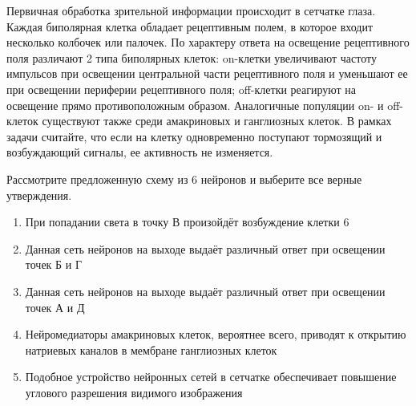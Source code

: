 
Первичная обработка зрительной информации происходит в
сетчатке глаза. Каждая биполярная клетка обладает рецептивным полем, в которое
входит несколько колбочек или палочек. По характеру ответа на освещение
рецептивного поля различают 2 типа биполярных клеток: on-клетки увеличивают частоту импульсов при освещении центральной
части рецептивного поля и уменьшают ее при освещении периферии рецептивного
поля; off-клетки реагируют на
освещение прямо противоположным образом. Аналогичные популяции on- и off-клеток
существуют также среди амакриновых и ганглиозных клеток. В рамках задачи
считайте, что если на клетку одновременно поступают тормозящий и возбуждающий
сигналы, ее активность не изменяется.


Рассмотрите предложенную схему из 6 нейронов и
выберите все верные утверждения.

\begin{enumerate}
    \item При попадании света в точку В произойдёт возбуждение клетки 6
    \item Данная сеть нейронов на выходе выдаёт различный ответ при освещении точек Б и Г
    \item Данная сеть нейронов на выходе выдаёт различный ответ при освещении точек А и Д
    \item Нейромедиаторы амакриновых клеток, вероятнее всего, приводят к открытию натриевых каналов в мембране ганглиозных клеток
    \item Подобное устройство нейронных сетей в сетчатке обеспечивает повышение углового разрешения видимого изображения
\end{enumerate}

\explanationSection

